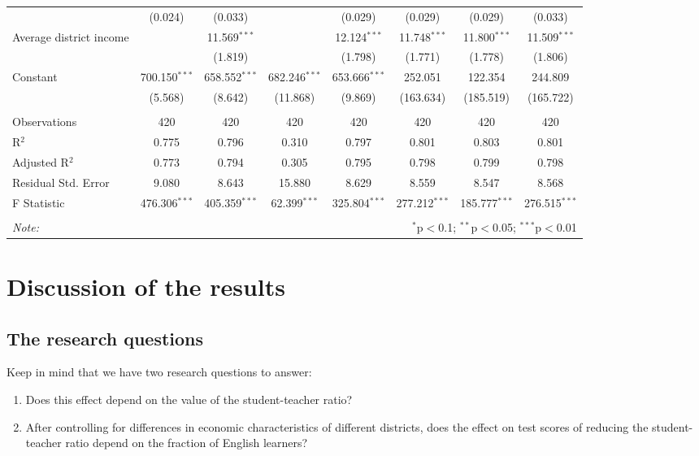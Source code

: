 \documentclass[11pt]{article}
\begin{document}
\begin{table}
\begin{tabular}{@{\extracolsep{5pt}}lccccccc}
  & (0.024) & (0.033) &  & (0.029) & (0.029) & (0.029) & (0.033) \\
  Average district income &  & 11.569$^{***}$ &  & 12.124$^{***}$ & 11.748$^{***}$ & 11.800$^{***}$ & 11.509$^{***}$ \\
  &  & (1.819) &  & (1.798) & (1.771) & (1.778) & (1.806) \\
  Constant & 700.150$^{***}$ & 658.552$^{***}$ & 682.246$^{***}$ & 653.666$^{***}$ & 252.051 & 122.354 & 244.809 \\
  & (5.568) & (8.642) & (11.868) & (9.869) & (163.634) & (185.519) & (165.722) \\
 \hline \\[-1.8ex]
Observations & 420 & 420 & 420 & 420 & 420 & 420 & 420 \\
R$^{2}$ & 0.775 & 0.796 & 0.310 & 0.797 & 0.801 & 0.803 & 0.801 \\
Adjusted R$^{2}$ & 0.773 & 0.794 & 0.305 & 0.795 & 0.798 & 0.799 & 0.798 \\
Residual Std. Error & 9.080 & 8.643 & 15.880 & 8.629 & 8.559 & 8.547 & 8.568 \\
F Statistic & 476.306$^{***}$ & 405.359$^{***}$ & 62.399$^{***}$ & 325.804$^{***}$ & 277.212$^{***}$ & 185.777$^{***}$ & 276.515$^{***}$ \\
\hline
\hline \\[-1.8ex]
\textit{Note:}  & \multicolumn{7}{r}{$^{*}$p$<$0.1; $^{**}$p$<$0.05; $^{***}$p$<$0.01} \\
\end{tabular}
\end{table}

\section{Discussion of the results}
\label{sec:org93c8c99}
\subsection*{The research questions}
\label{sec:org712d216}
Keep in mind that we have two research questions to answer:
\begin{enumerate}
\item Does this effect depend on the value of the student-teacher ratio?
\item After controlling for differences in economic characteristics of
different districts, does the effect on test scores of reducing the
student-teacher ratio depend on the fraction of English learners?
\end{enumerate}
\end{document}
